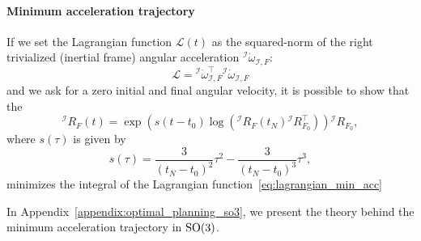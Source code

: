 \paragraph{Minimum acceleration trajectory}
If we set the Lagrangian function $\mathcal{L}(t)$ as the squared-norm of the right trivialized (inertial frame) angular acceleration ${}^\mathcal{I} \dot{\omega}_{\mathcal{I}, F}$:
\begin{equation}
    \label{eq:lagrangian_min_acc}
    \mathcal{L} = {}^\mathcal{I} \dot{\omega}_{\mathcal{I}, F}^\top {}^\mathcal{I} \dot{\omega}_{\mathcal{I}, F}
\end{equation}
and we ask for a zero initial and final angular velocity, 
it is possible to show that the  
\begin{equation}
    \label{eq:min_acc_rot}
    {}^\mathcal{I}R_F(t) = \exp{\left(s(t-t_0) \log\left( {}^\mathcal{I}R_F(t_N) {}^\mathcal{I}R_{F_0}^\top  \right)\right)} {}^\mathcal{I}R_{F_0},
\end{equation}
where $s(\tau)$ is given by
\begin{equation}
\label{eq:min_acc_rot_s}
    s(\tau) = \frac{3}{(t_N - t_0)^2} \tau^2 - \frac{3}{(t_N - t_0)^3} \tau^3,
\end{equation}
minimizes the integral of the Lagrangian function~\eqref{eq:lagrangian_min_acc}~\citep[Section~9.2]{Lynch2017ModernControl}\citep{Zefran1999MetricsKinematics,Zefran1998OnMotions,Park1997SmoothRotations}
\par
In Appendix~\ref{appendix:optimal_planning_so3}, we present the theory behind the minimum acceleration trajectory in $\mathrm{SO}(3)$. 

